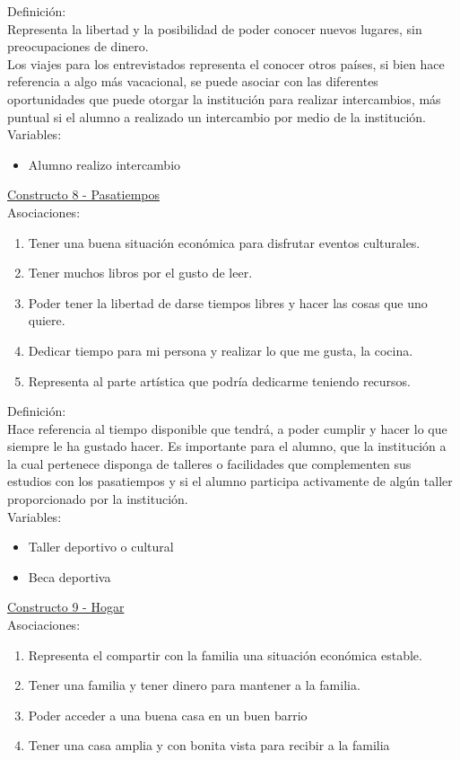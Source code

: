Definición:\\
Representa la libertad y la posibilidad de poder conocer nuevos lugares, sin preocupaciones de dinero.\\

Los viajes para los entrevistados representa el conocer otros países, si bien hace referencia a algo más vacacional, se puede asociar con las diferentes oportunidades que puede otorgar la institución para realizar intercambios, más puntual si el alumno a realizado un intercambio por medio de la institución.\\

Variables:
\begin{itemize}
	\item Alumno realizo intercambio
\end{itemize}


\underline {Constructo 8 - Pasatiempos} \\
Asociaciones:
\begin{enumerate}
	\item Tener una buena situación económica para disfrutar eventos culturales.
	\item Tener muchos libros por el gusto de leer.
	\item Poder tener la libertad de darse tiempos libres y hacer las cosas que uno quiere.
	\item Dedicar tiempo para mi persona y realizar lo que me gusta, la cocina.	
	\item Representa al parte artística que podría dedicarme teniendo recursos.
\end{enumerate}

Definición:\\
Hace referencia al tiempo disponible que tendrá, a poder cumplir y hacer lo que siempre le ha gustado hacer. Es importante para el alumno, que la institución a la cual pertenece disponga de talleres o facilidades que complementen sus estudios con los pasatiempos y si el alumno participa activamente de algún taller proporcionado por la institución.\\


Variables:
\begin{itemize}
	\item Taller deportivo o cultural 
	\item Beca deportiva
\end{itemize}


\underline {Constructo 9 - Hogar} \\
Asociaciones:
\begin{enumerate}
	\item Representa el compartir con la familia una situación económica estable.
	\item Tener una familia y tener dinero para mantener a la familia.
	\item Poder acceder a una buena casa en un buen barrio
	\item Tener una casa amplia y con bonita vista para recibir a la familia	
\end{enumerate}


